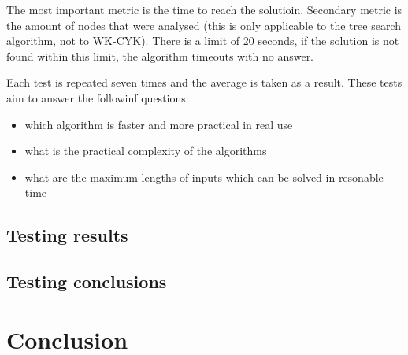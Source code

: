 The most important metric is the time to reach the solutioin. Secondary metric is the amount of nodes that were analysed (this is only applicable to the tree search algorithm, not to WK-CYK). There is a limit of 20 seconds, if the solution is not found within this limit, the algorithm timeouts with no answer.

Each test is repeated seven times and the average is taken as a result. These tests aim to answer the followinf questions:
\begin{itemize}
  \item{which algorithm is faster and more practical in real use}
  \item{what is the practical complexity of the algorithms}
  \item{what are the maximum lengths of inputs which can be solved in resonable time}
\end{itemize}

\section{Testing results}

\section{Testing conclusions}


\chapter{Conclusion}
